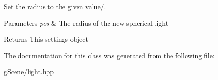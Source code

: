 Set the radius to the given value/. 


\begin{DoxyParams}{Parameters}
{\em pos} & The radius of the new spherical light \\
\hline
\end{DoxyParams}
\begin{DoxyReturn}{Returns}
This settings object 
\end{DoxyReturn}


The documentation for this class was generated from the following file\-:\begin{DoxyCompactItemize}
\item 
g\-Scene/light.\-hpp\end{DoxyCompactItemize}
